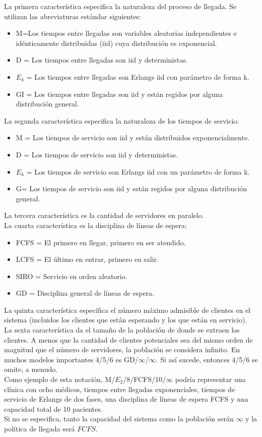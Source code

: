 La primera característica especifica la naturaleza del proceso de llegada. Se utilizan las abreviaturas estándar siguientes:
\begin{itemize}
	\item M=Los tiempos entre llegadas son variables aleatorias independientes e idénticamente distribuidas (iid) cuya distribución es exponencial.
	\item D = Los tiempos entre llegadas son iid y deterministas.
	\item $E_k$ = Los tiempos entre llegadas son Erlangs iid con parámetro de forma k.
	\item GI = Los tiempos entre llegadas son iid y están regidos por alguna distribución general.
\end{itemize}
La segunda característica especifica la naturaleza de los tiempos de servicio:
\begin{itemize}
	\item M = Los tiempos de servicio son iid y están distribuidos exponencialmente.
	\item D = Los tiempos de servicio son iid y deterministas.
	\item $E_k$ = Los tiempos de servicio son Erlangs iid con un parámetro de forma k.
	\item G= Los tiempos de servicio son iid y están regidos por alguna distribución general.
\end{itemize}
La tercera característica es la cantidad de servidores en paralelo. 
\\ La cuarta característica es la disciplina de líneas de espera:
\begin{itemize}
	\item FCFS = El primero en llegar, primero en ser atendido.
	\item LCFS = El último en entrar, primero en salir.
	\item SIRO = Servicio en orden aleatorio.
	\item GD = Disciplina general de líneas de espera.
\end{itemize}
La quinta característica específica el número máximo admisible de clientes en el sistema (incluidos los clientes que están esperando y los que están en servicio). 
\\ La sexta característica da el tamaño de la población de donde se extraen los clientes. A menos que la cantidad de clientes potenciales sea del mismo orden de magnitud que el número de servidores, la población se considera infinito. En muchos modelos importantes 4/5/6 es GD/$\infty$/$\infty$. Si así sucede, entonces 4/5/6 se omite, a menudo.
\\
Como ejemplo de esta notación, M/$E_2$/8/FCFS/10/$\infty$ podría representar una clínica con ocho médicos, tiempos entre llegadas exponenciales, tiempos de servicio de Erlangs de dos fases, una disciplina de líneas de espera FCFS y una capacidad total de 10 pacientes. \\
Si no se especifica, tanto la capacidad del sistema como la población serán $\infty$ y la política de llegada será $FCFS$.
